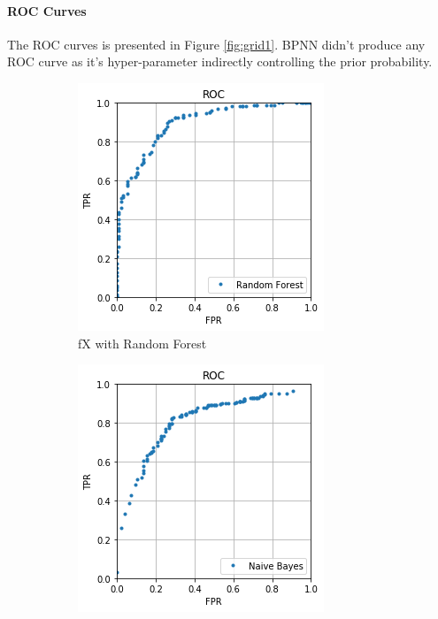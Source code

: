 \documentclass{article}
\begin{document}
\paragraph{ROC Curves}
The ROC curves is presented in Figure \ref{fig:grid1}. BPNN didn’t produce any ROC curve as it's hyper-parameter indirectly controlling the prior probability.

\begin{figure}[h]
\begin{subfigure}{.4\columnwidth}
  \centering
  \includegraphics[width=\linewidth]{ROC_curve_fX.png}  
  \caption{fX with Random Forest}
\end{subfigure} \hfill
\begin{subfigure}{.4\columnwidth}
  \centering
  \includegraphics[width=\linewidth]{ROC_curve_pX_NB.png}  

\end{subfigure}
\end{figure}
\end{document}
